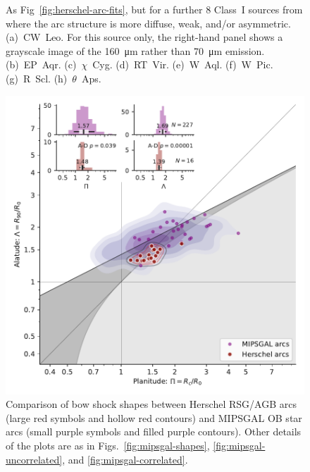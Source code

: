 \begin{figure}
\begin{tabular}{ll}
  \end{tabular}
  \caption{As Fig~\ref{fig:herschel-arc-fits}, but for a further 8
    Class~I sources from \citet{Cox:2012a} where the arc structure is
    more diffuse, weak, and/or asymmetric. (a)~CW~Leo. For this source
    only, the right-hand panel shows a grayscale image of the
    \SI{160}{\um} rather than \SI{70}{\um}
    emission. (b)~EP~Aqr. (c)~\(\chi\)~Cyg. (d)~RT~Vir. (e)~W~Aql. (f)~W~Pic. (g)~R~Scl.
    (h)~\(\theta\)~Aps.}
  \label{fig:herschel-arc-fits-poor}
\end{figure}


\begin{figure}
  \centering
  \includegraphics[width=\linewidth]{figs/mipsgal-Rc-R90-vs-Herschel}
  \caption[]{Comparison of bow shock shapes between Herschel RSG/AGB
    arcs (large red symbols and hollow red contours) and MIPSGAL OB
    star arcs (small purple symbols and filled purple contours).
    Other details of the plots are as in
    Figs.~\ref{fig:mipsgal-shapes}, \ref{fig:mipsgal-uncorrelated},
    and \ref{fig:mipsgal-correlated}.}
  \label{fig:herschel-compare-mipsgal}
\end{figure}

